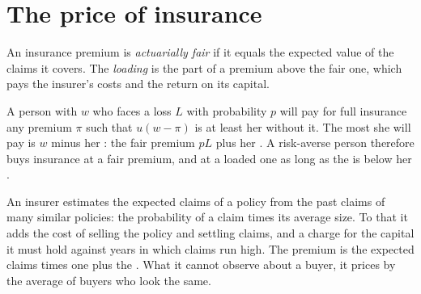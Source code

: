 \section{The price of insurance}\label{sec:g12:risk-and-insurance:price}

\begin{definition}\label{def:g12:risk-and-insurance:fair-premium}
An insurance premium is \emph{actuarially fair} if it equals the expected value of the claims it covers. The \emph{loading}%
\label{def:g12:risk-and-insurance:loading} is the part of a premium above the fair one, which pays the insurer's costs and the return on its capital.
\end{definition}

A person with  $w$ who faces a loss $L$ with probability $p$ will pay for full insurance any premium $\pi$ such that $u(w - \pi)$ is at least her 
without it. The most she will pay is $w$ minus her : the fair premium $pL$ plus her . A risk-averse person therefore buys insurance at a
fair premium, and at a loaded one as long as the  is below her .

\begin{measure}
An insurer estimates the expected claims of a policy from the past claims of many similar policies: the probability of a claim times its average size. To that it adds
the cost of selling the policy and settling claims, and a charge for the capital it must hold against years in which claims run high. The premium is the expected claims
times one plus the . What it cannot observe about a buyer, it prices by the average of buyers who look the same.
\end{measure}

